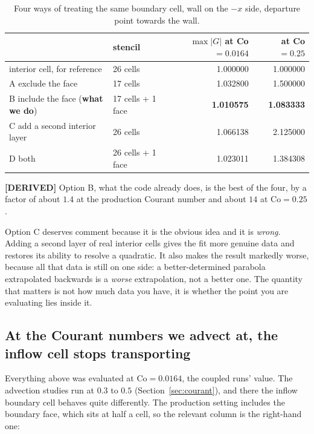 \documentclass[11pt,a4paper]{article}
\newcommand{\derived}{\textcolor{blue!50!black}{\textbf{[DERIVED]}}}
\begin{document}
\begin{table}[h]
\centering
\caption{Four ways of treating the same boundary cell, wall on the $-x$ side, departure point
towards the wall.}
\label{tab:options}
\begin{tabular}{llrr}
\toprule
 & stencil & $\max|G|$ at Co $=0.0164$ & at Co $=0.25$ \\
\midrule
interior cell, for reference        & 26 cells            & 1.000000 & 1.000000 \\
A \; exclude the face               & 17 cells            & 1.032800 & 1.500000 \\
B \; include the face (\textbf{what we do}) & 17 cells + 1 face & \textbf{1.010575} & \textbf{1.083333} \\
C \; add a second interior layer    & 26 cells            & 1.066138 & 2.125000 \\
D \; both                           & 26 cells + 1 face   & 1.023011 & 1.384308 \\
\bottomrule
\end{tabular}
\end{table}

\derived{} Option B, what the code already does, is the best of the four, by a factor of
about $1.4$ at the production Courant number and about $14$ at $\mathrm{Co} = 0.25$.

Option C deserves comment because it is the obvious idea and it is \emph{wrong}. Adding a
second layer of real interior cells gives the fit more genuine data and restores its ability
to resolve a quadratic. It also makes the result markedly worse, because all that data is
still on one side: a better-determined parabola extrapolated backwards is a \emph{worse}
extrapolation, not a better one. The quantity that matters is not how much data you have, it
is whether the point you are evaluating lies inside it.

\subsection{At the Courant numbers we advect at, the inflow cell stops transporting}
\label{sec:frozen}

Everything above was evaluated at $\mathrm{Co} = 0.0164$, the coupled runs' value. The
advection studies run at $0.3$ to $0.5$ (Section~\ref{sec:courant}), and there the inflow
boundary cell behaves quite differently. The production setting includes the boundary face,
which sits at half a cell, so the relevant column is the right-hand one:
\end{document}
